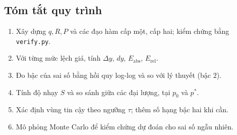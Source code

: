\subsection{Tóm tắt quy trình}
\begin{enumerate}
  \item Xây dựng $q,R,P$ và các đạo hàm cấp một, cấp hai; kiểm chứng bằng \texttt{verify.py}.
  \item Với từng mức lệch giá, tính $\Delta y$, $dy$, $E_{\mathrm{abs}}$, $E_{\mathrm{rel}}$.
  \item Đo bậc của sai số bằng hồi quy log-log và so với lý thuyết (bậc $2$).
  \item Tính độ nhạy $S$ và so sánh giữa các đại lượng, tại $p_0$ và $p^*$.
  \item Xác định vùng tin cậy theo ngưỡng $\tau$; thêm số hạng bậc hai khi cần.
  \item Mô phỏng Monte Carlo để kiểm chứng dự đoán cho sai số ngẫu nhiên.
\end{enumerate}
